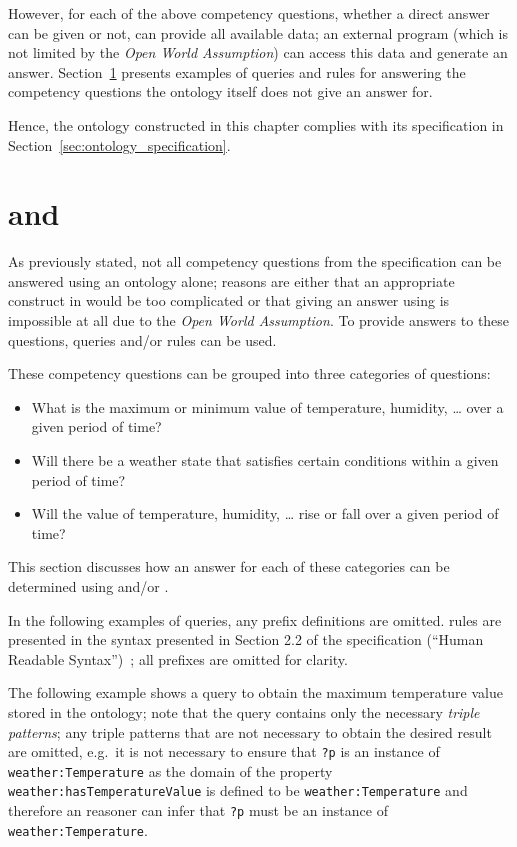 However, for each of the above competency questions, whether a direct answer can be given or not, \smarthomeweather can provide all available data; an external program (which is not limited by the \emph{Open World Assumption}) can access this data and generate an answer. Section~\ref{sec:queries_rules} presents examples of  queries and  rules for answering the competency questions the ontology itself does not give an answer for.

Hence, the ontology constructed in this chapter complies with its specification in Section~\ref{sec:ontology_specification}.

\section{ and }
\label{sec:queries_rules}

As previously stated, not all competency questions from the specification can be answered using an  ontology alone; reasons are either that an appropriate construct in  would be too complicated or that giving an answer using  is impossible at all due to the \emph{Open World Assumption}. To provide answers to these questions,  queries and/or  rules can be used.

These competency questions can be grouped into three categories of questions:
\begin{itemize}
  \item What is the maximum or minimum value of temperature, humidity, … over a given period of time?
  \item Will there be a weather state that satisfies certain conditions within a given period of time?
  \item Will the value of temperature, humidity, … rise or fall over a given period of time?
\end{itemize}

This section discusses how an answer for each of these categories can be determined using  and/or .

In the following examples of  queries, any prefix definitions are omitted.  rules are presented in the syntax presented in Section 2.2 of the  specification (``Human Readable Syntax'')~\cite{SWRL}; all prefixes are omitted for clarity.

The following example shows a  query to obtain the maximum temperature value stored in the ontology; note that the query contains only the necessary \emph{triple patterns}; any triple patterns that are not necessary to obtain the desired result are omitted, e.g.\ it is not necessary to ensure that \texttt{?p} is an instance of \texttt{weather:Temperature} as the domain of the property \texttt{weather:hasTemperatureValue} is defined to be \texttt{weather:Temperature} and therefore an  reasoner can infer that \texttt{?p} must be an instance of \texttt{weather:Temperature}.

